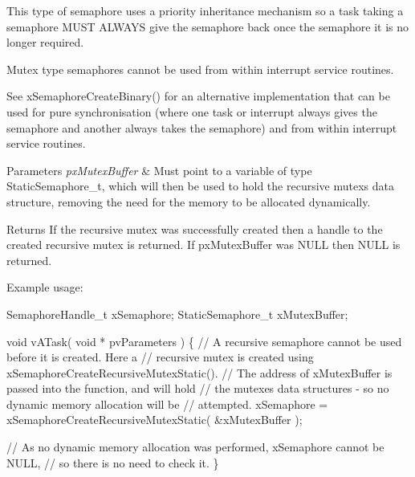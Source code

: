 This type of semaphore uses a priority inheritance mechanism so a task \textquotesingle{}taking\textquotesingle{} a semaphore M\+U\+ST A\+L\+W\+A\+YS \textquotesingle{}give\textquotesingle{} the semaphore back once the semaphore it is no longer required.

Mutex type semaphores cannot be used from within interrupt service routines.

See x\+Semaphore\+Create\+Binary() for an alternative implementation that can be used for pure synchronisation (where one task or interrupt always \textquotesingle{}gives\textquotesingle{} the semaphore and another always \textquotesingle{}takes\textquotesingle{} the semaphore) and from within interrupt service routines.


\begin{DoxyParams}{Parameters}
{\em px\+Mutex\+Buffer} & Must point to a variable of type Static\+Semaphore\+\_\+t, which will then be used to hold the recursive mutex\textquotesingle{}s data structure, removing the need for the memory to be allocated dynamically.\\
\hline
\end{DoxyParams}
\begin{DoxyReturn}{Returns}
If the recursive mutex was successfully created then a handle to the created recursive mutex is returned. If px\+Mutex\+Buffer was N\+U\+LL then N\+U\+LL is returned.
\end{DoxyReturn}
Example usage\+: 
\begin{DoxyPre}
SemaphoreHandle\_t xSemaphore;
StaticSemaphore\_t xMutexBuffer;\end{DoxyPre}



\begin{DoxyPre}void vATask( void * pvParameters )
\{
   // A recursive semaphore cannot be used before it is created.  Here a
   // recursive mutex is created using xSemaphoreCreateRecursiveMutexStatic().
   // The address of xMutexBuffer is passed into the function, and will hold
   // the mutexes data structures - so no dynamic memory allocation will be
   // attempted.
   xSemaphore = xSemaphoreCreateRecursiveMutexStatic( \&xMutexBuffer );\end{DoxyPre}



\begin{DoxyPre}   // As no dynamic memory allocation was performed, xSemaphore cannot be NULL,
   // so there is no need to check it.
\}
\end{DoxyPre}
 